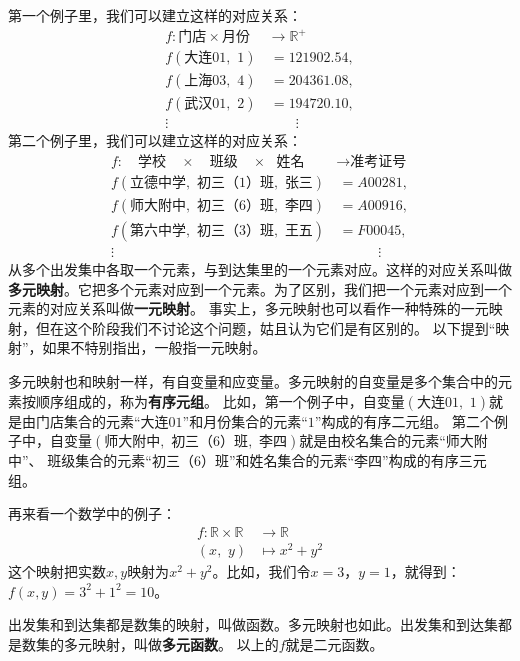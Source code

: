 \documentclass[12pt,UTF8,fontset=none]{ctexbook}
\begin{document}
第一个例子里，我们可以建立这样的对应关系：
\begin{align*}
    f :\mbox{门店} \times \mbox{月份} &\rightarrow \mathbb{R}^+  \\
    f(\mbox{大连}01, \,\, 1) &\,= 121902.54,  \\
    f(\mbox{上海}03, \,\, 4) &\,= 204361.08,  \\
    f(\mbox{武汉}01, \,\, 2) &\,= 194720.10,  \\
    \vdots \quad & \quad\quad \vdots 
\end{align*}
第二个例子里，我们可以建立这样的对应关系：
\begin{align*}
    f :\quad\mbox{学校} \quad \times \quad \mbox{班级} \quad \times \,\,\,\, \mbox{姓名} \,\, &\rightarrow \mbox{准考证号}  \\
    f(\mbox{立德中学}, \,\, \mbox{初三（1）班}, \,\, \mbox{张三}) &\,= A00281,  \\
    f(\mbox{师大附中}, \,\, \mbox{初三（6）班}, \,\, \mbox{李四}) &\,= A00916,  \\
    f(\mbox{第六中学}, \,\, \mbox{初三（3）班}, \,\, \mbox{王五}) &\,= F00045,  \\
    \vdots \quad\quad & \quad\quad\quad \vdots 
\end{align*}
从多个出发集中各取一个元素，与到达集里的一个元素对应。这样的对应关系叫做\textbf{多元映射}。它把多个元素对应到一个元素。为了区别，我们把一个元素对应到一个元素的对应关系叫做\textbf{一元映射}。
事实上，多元映射也可以看作一种特殊的一元映射，但在这个阶段我们不讨论这个问题，姑且认为它们是有区别的。
以下提到“映射”，如果不特别指出，一般指一元映射。

多元映射也和映射一样，有自变量和应变量。多元映射的自变量是多个集合中的元素按顺序组成的，称为\textbf{有序元组}。
比如，第一个例子中，自变量$(\mbox{大连}01, \,\, 1)$就是由门店集合的元素“大连$01$”和月份集合的元素“$1$”构成的有序二元组。
第二个例子中，自变量$(\mbox{师大附中}, \,\, \mbox{初三（6）班}, \,\, \mbox{李四})$就是由校名集合的元素“师大附中”、
班级集合的元素“初三（$6$）班”和姓名集合的元素“李四”构成的有序三元组。

再来看一个数学中的例子：
\begin{align*}
    f: \mathbb{R} \times \mathbb{R} &\rightarrow \mathbb{R}  \\
    (x,\,\, y) &\mapsto x^2 + y^2  
\end{align*}
这个映射把实数$x,y$映射为$x^2 + y^2$。比如，我们令$x = 3$，$y =1$，就得到：
$f(x,y) = 3^2 + 1^2 = 10$。

出发集和到达集都是数集的映射，叫做函数。多元映射也如此。出发集和到达集都是数集的多元映射，叫做\textbf{多元函数}。
以上的$f$就是二元函数。
\end{document}
